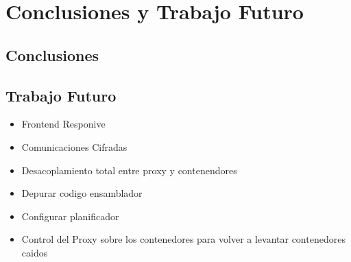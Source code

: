 \chapter{Conclusiones y Trabajo Futuro}\label{chap:conclusiones}
\section{Conclusiones}

\section{Trabajo Futuro}
\begin{itemize}
    \item Frontend Responive
    \item Comunicaciones Cifradas
    \item Desacoplamiento total entre proxy y contenendores
    \item Depurar codigo ensamblador
    \item Configurar planificador
    \item Control del Proxy sobre los contenedores para volver a levantar contenedores caidos
\end{itemize}
